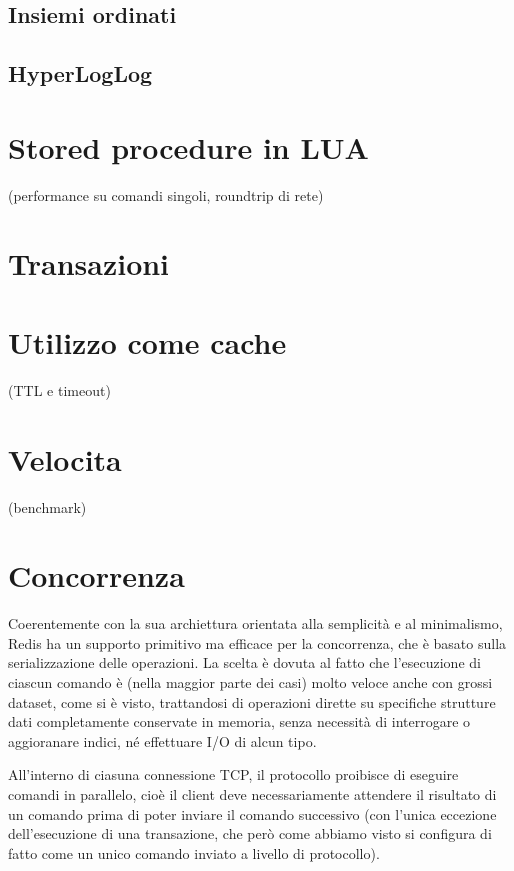 \subsection{Insiemi ordinati}

\subsection{HyperLogLog}

\section{Stored procedure in LUA}

(performance su comandi singoli, roundtrip di rete)


\section{Transazioni}


\section{Utilizzo come cache}

(TTL e timeout)


\section{Velocita}

(benchmark)


\section{Concorrenza}

Coerentemente con la sua archiettura orientata alla semplicità e al minimalismo, Redis ha un supporto primitivo
ma efficace per la concorrenza, che è basato sulla serializzazione delle operazioni. La scelta è dovuta al fatto che 
l'esecuzione di ciascun comando è (nella maggior parte dei casi) molto veloce anche con grossi dataset, come
si è visto, trattandosi di operazioni dirette su specifiche strutture dati completamente conservate in memoria, 
senza necessità di interrogare o aggioranare indici, né effettuare I/O di alcun tipo.

All'interno di ciasuna connessione TCP, il protocollo proibisce di eseguire comandi in parallelo, cioè il client 
deve necessariamente attendere il risultato di un comando prima di poter inviare il comando successivo (con l'unica
eccezione dell'esecuzione di una transazione, che però come abbiamo visto si configura di fatto come un unico
comando inviato a livello di protocollo).


